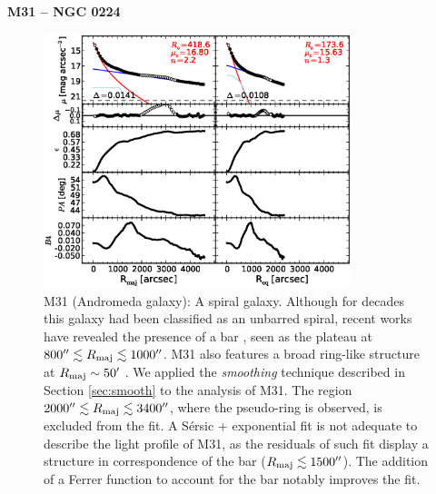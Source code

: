 \documentclass[preprint2]{emulateapj}
\newcommand{\fitfigurewidth}{0.8\textwidth}
\begin{document}
  \clearpage\newpage\noindent
  {\bf M31 -- NGC 0224 \\}

  \begin{figure}[h]
  \begin{center}
  \includegraphics[width=\fitfigurewidth]{images/m31_1Dfit.eps}
  \caption{M31 (Andromeda galaxy):
  A spiral galaxy. 
  Although for decades this galaxy had been classified as an unbarred spiral,
  recent works have revealed the presence of a bar \citep{athanassoulabeaton2006m31,beaton2007m31,morrison2011m31}, 
  seen as the plateau at $800'' \lesssim R_{\rm maj} \lesssim 1000''$.
  M31 also features a broad ring-like structure at $R_{\rm maj} \sim 50'$ \citep{athanassoulabeaton2006m31}. 
  We applied the \emph{smoothing} technique described in Section \ref{sec:smooth} to the analysis of M31.
  The region $2000'' \lesssim R_{\rm maj} \lesssim 3400''$, where the pseudo-ring is observed, is excluded from the fit.
  A S\'ersic + exponential fit is not adequate to describe the light profile of M31,
  as the residuals of such fit display a structure in correspondence of the bar ($R_{\rm maj} \lesssim 1500''$).
  The addition of a Ferrer function to account for the bar notably improves the fit.
  }
  \end{center}
  \end{figure}
\end{document}
